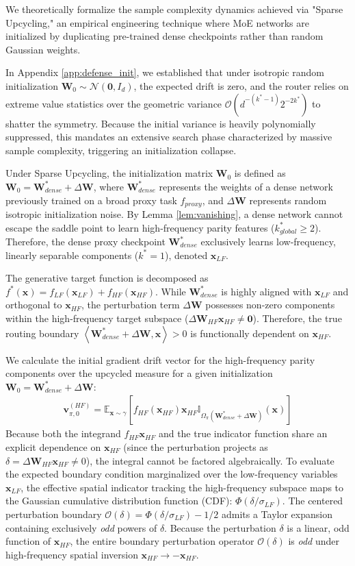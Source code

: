 \documentclass{article}
\newcommand{\E}{\mathbb{E}}
\newcommand{\1}{\mathbb{I}}
\newcommand{\inner}[2]{\left\langle#1, #2\right\rangle}
\newcommand{\calO}{\mathcal{O}}
\newcommand{\bx}{\mathbf{x}}
\newcommand{\bv}{\mathbf{v}}
\newcommand{\bW}{\mathbf{W}}
\newcommand{\calN}{\mathcal{N}}
\begin{document}
We theoretically formalize the sample complexity dynamics achieved via "Sparse Upcycling," an empirical engineering technique where MoE networks are initialized by duplicating pre-trained dense checkpoints \citep{komatsuzaki2023sparse} rather than random Gaussian weights.

In Appendix \ref{app:defense_init}, we established that under isotropic random initialization $\bW_0 \sim \calN(\mathbf{0}, I_d)$, the expected drift is zero, and the router relies on extreme value statistics over the geometric variance $\calO(d^{-(k^*-1)} 2^{-2k^*})$ to shatter the symmetry. Because the initial variance is heavily polynomially suppressed, this mandates an extensive search phase characterized by massive sample complexity, triggering an initialization collapse.

Under Sparse Upcycling, the initialization matrix $\bW_0$ is defined as $\bW_0 = \bW_{dense}^* + \Delta \bW$, where $\bW_{dense}^*$ represents the weights of a dense network previously trained on a broad proxy task $f_{proxy}$, and $\Delta \bW$ represents random isotropic initialization noise. By Lemma \ref{lem:vanishing}, a dense network cannot escape the saddle point to learn high-frequency parity features ($k_{global}^* \ge 2$). Therefore, the dense proxy checkpoint $\bW_{dense}^*$ exclusively learns low-frequency, linearly separable components ($k^*=1$), denoted $\bx_{LF}$.

The generative target function is decomposed as $f^*(\bx) = f_{LF}(\bx_{LF}) + f_{HF}(\bx_{HF})$. While $\bW_{dense}^*$ is highly aligned with $\bx_{LF}$ and orthogonal to $\bx_{HF}$, the perturbation term $\Delta \bW$ possesses non-zero components within the high-frequency target subspace ($\Delta \bW_{HF} \bx_{HF} \neq \mathbf{0}$). Therefore, the true routing boundary $\inner{\bW_{dense}^* + \Delta \bW}{\bx} > 0$ is functionally dependent on $\bx_{HF}$. 

We calculate the initial gradient drift vector for the high-frequency parity components over the upcycled measure for a given initialization $\bW_0 = \bW_{dense}^* + \Delta \bW$:
\begin{align}
    \bv_{\pi, 0}^{(HF)} = \E_{\bx \sim \gamma}\left[ f_{HF}(\bx_{HF}) \bx_{HF} \1_{\Omega_\pi(\bW_{dense}^* + \Delta \bW)}(\bx) \right]
\end{align}
Because both the integrand $f_{HF}\bx_{HF}$ and the true indicator function share an explicit dependence on $\bx_{HF}$ (since the perturbation projects as $\delta = \Delta \bW_{HF} \bx_{HF} \neq 0$), the integral cannot be factored algebraically. To evaluate the expected boundary condition marginalized over the low-frequency variables $\bx_{LF}$, the effective spatial indicator tracking the high-frequency subspace maps to the Gaussian cumulative distribution function (CDF): $\Phi(\delta / \sigma_{LF})$. The centered perturbation boundary $\calO(\delta) = \Phi(\delta / \sigma_{LF}) - 1/2$ admits a Taylor expansion containing exclusively \textit{odd} powers of $\delta$. Because the perturbation $\delta$ is a linear, odd function of $\bx_{HF}$, the entire boundary perturbation operator $\calO(\delta)$ is \textit{odd} under high-frequency spatial inversion $\bx_{HF} \to -\bx_{HF}$.
\end{document}

